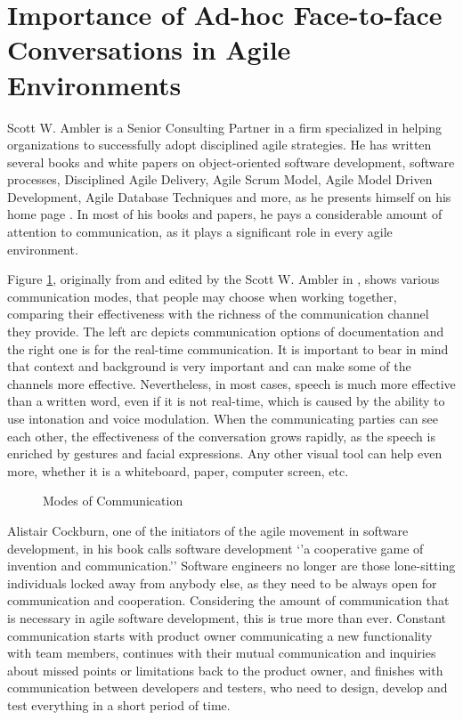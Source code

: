 \documentclass[11pt,singleside]{myfithesis2}
\newcommand{\pict}[4]{
	\begin{figure}[h!]
  		\vspace{-7px}
  		\centerline{\fcolorbox{darkgray}{palegray}{\texttt{[image: \#2]}}}
  		\caption{#1}
  		\label{#4}
	\end{figure}
}
\begin{document}
	\section{Importance of Ad-hoc Face-to-face Conversations in Agile Environments}\label{commImportance}
Scott W. Ambler is a Senior Consulting Partner in a firm specialized in helping organizations to successfully adopt disciplined agile strategies. He has written several books and white papers on object-oriented software development, software processes, Disciplined Agile Delivery, Agile Scrum Model, Agile Model Driven Development, Agile Database Techniques and more, as he presents himself on his home page \cite{ambler}. In most of his books and papers, he pays a considerable amount of attention to communication, as it plays a significant role in every agile environment. 
	
Figure \ref{pic:commModes}, originally from \cite{agileCockburn} and edited by the Scott W. Ambler in \cite{roninInt}, shows various communication modes, that people may choose when working together, comparing their effectiveness with the richness of the communication channel they provide. The left arc depicts communication options of documentation and the right one is for the real-time communication. It is important to bear in mind that context and background is very important and can make some of the channels more effective. Nevertheless, in most cases, speech is much more effective than a written word, even if it is not real-time, which is caused by the ability to use intonation and voice modulation. When the communicating parties can see each other, the effectiveness of the conversation grows rapidly, as the speech is enriched by gestures and facial expressions. Any other visual tool can help even more, whether it is a whiteboard, paper, computer screen, etc.

\pict{Modes of Communication \cite{roninInt}}{data/communicationModes.png}{width=0.8\textwidth}{pic:commModes}

Alistair Cockburn, one of the initiators of the agile movement in software development, in his book \cite{commCockburn} calls software development `'a cooperative game of invention and communication.'' Software engineers no longer are those lone-sitting individuals locked away from anybody else, as they need to be always open for communication and cooperation. Considering the amount of communication that is necessary in agile software development, this is true more than ever. Constant communication starts with product owner communicating a new functionality with team members, continues with their mutual communication and inquiries about missed points or limitations back to the product owner, and finishes with communication between developers and testers, who need to design, develop and test everything in a short period of time. 
\end{document}
